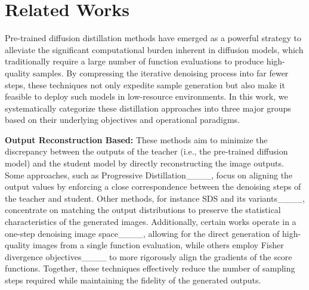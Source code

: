 \section{Related Works}
\label{sec:related}





Pre-trained diffusion distillation methods have emerged as a powerful strategy to alleviate the significant computational burden inherent in diffusion models, which traditionally require a large number of function evaluations to produce high-quality samples. By compressing the iterative denoising process into far fewer steps, these techniques not only expedite sample generation but also make it feasible to deploy such models in low-resource environments. In this work, we systematically categorize these distillation approaches into three major groups based on their underlying objectives and operational paradigms.

\textbf{Output Reconstruction Based:} These methods aim to minimize the discrepancy between the outputs of the teacher (i.e., the pre-trained diffusion model) and the student model by directly reconstructing the image outputs. Some approaches, such as Progressive Distillation____, focus on aligning the output values by enforcing a close correspondence between the denoising steps of the teacher and student. Other methods, for instance SDS and its variants____, concentrate on matching the output distributions to preserve the statistical characteristics of the generated images. Additionally, certain works operate in a one-step denoising image space____, allowing for the direct generation of high-quality images from a single function evaluation, while others employ Fisher divergence objectives____ to more rigorously align the gradients of the score functions. Together, these techniques effectively reduce the number of sampling steps required while maintaining the fidelity of the generated outputs.

